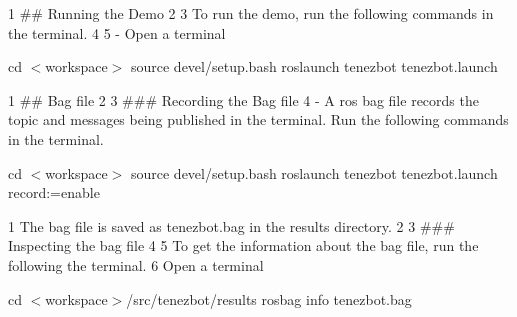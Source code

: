 \begin{DoxyItemize}
\begin{DoxyCode}
1 ## Running the Demo
2 
3 To run the demo, run the following commands in the terminal.
4 
5 - Open a terminal
\end{DoxyCode}
 cd $<$workspace$>$ source devel/setup.\+bash roslaunch tenezbot tenezbot.\+launch 
\begin{DoxyCode}
1 ## Bag file
2 
3 ### Recording the Bag file
4 - A ros bag file records the topic and messages being published in the terminal. Run the following commands
       in the terminal.
\end{DoxyCode}
 cd $<$workspace$>$ source devel/setup.\+bash roslaunch tenezbot tenezbot.\+launch record\+:=enable
\end{DoxyItemize}


\begin{DoxyCode}
1 The bag file is saved as tenezbot.bag in the results directory.
2 
3 ### Inspecting the bag file
4 
5 To get the information about the bag file, run the following the terminal.
6 Open a terminal
\end{DoxyCode}
 cd $<$workspace$>$/src/tenezbot/results rosbag info tenezbot.\+bag


